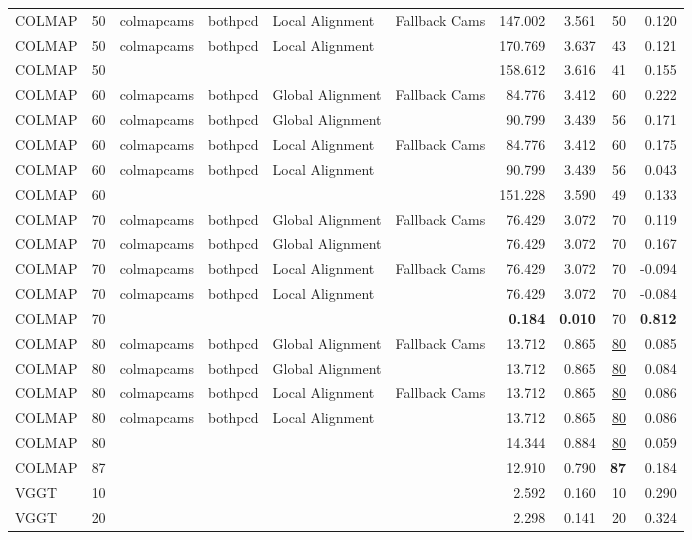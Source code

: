 \begin{table}[H]
\begin{tabular}{lrllllrrrr}
COLMAP & 50 & colmapcams & bothpcd & Local Alignment & Fallback Cams & 147.002 & 3.561 & 50 & 0.120 \\
COLMAP & 50 & colmapcams & bothpcd & Local Alignment &  & 170.769 & 3.637 & 43 & 0.121 \\
COLMAP & 50 &  &  &  &  & 158.612 & 3.616 & 41 & 0.155 \\
COLMAP & 60 & colmapcams & bothpcd & Global Alignment & Fallback Cams & 84.776 & 3.412 & 60 & 0.222 \\
COLMAP & 60 & colmapcams & bothpcd & Global Alignment &  & 90.799 & 3.439 & 56 & 0.171 \\
COLMAP & 60 & colmapcams & bothpcd & Local Alignment & Fallback Cams & 84.776 & 3.412 & 60 & 0.175 \\
COLMAP & 60 & colmapcams & bothpcd & Local Alignment &  & 90.799 & 3.439 & 56 & 0.043 \\
COLMAP & 60 &  &  &  &  & 151.228 & 3.590 & 49 & 0.133 \\
COLMAP & 70 & colmapcams & bothpcd & Global Alignment & Fallback Cams & 76.429 & 3.072 & 70 & 0.119 \\
COLMAP & 70 & colmapcams & bothpcd & Global Alignment &  & 76.429 & 3.072 & 70 & 0.167 \\
COLMAP & 70 & colmapcams & bothpcd & Local Alignment & Fallback Cams & 76.429 & 3.072 & 70 & -0.094 \\
COLMAP & 70 & colmapcams & bothpcd & Local Alignment &  & 76.429 & 3.072 & 70 & -0.084 \\
COLMAP & 70 &  &  &  &  & \textbf{0.184} & \textbf{0.010} & 70 & \textbf{0.812} \\
COLMAP & 80 & colmapcams & bothpcd & Global Alignment & Fallback Cams & 13.712 & 0.865 & \underline{80} & 0.085 \\
COLMAP & 80 & colmapcams & bothpcd & Global Alignment &  & 13.712 & 0.865 & \underline{80} & 0.084 \\
COLMAP & 80 & colmapcams & bothpcd & Local Alignment & Fallback Cams & 13.712 & 0.865 & \underline{80} & 0.086 \\
COLMAP & 80 & colmapcams & bothpcd & Local Alignment &  & 13.712 & 0.865 & \underline{80} & 0.086 \\
COLMAP & 80 &  &  &  &  & 14.344 & 0.884 & \underline{80} & 0.059 \\
COLMAP & 87 &  &  &  &  & 12.910 & 0.790 & \textbf{87} & 0.184 \\
VGGT & 10 &  &  &  &  & 2.592 & 0.160 & 10 & 0.290 \\
VGGT & 20 &  &  &  &  & 2.298 & 0.141 & 20 & 0.324 \\

\end{tabular}
\end{table}

